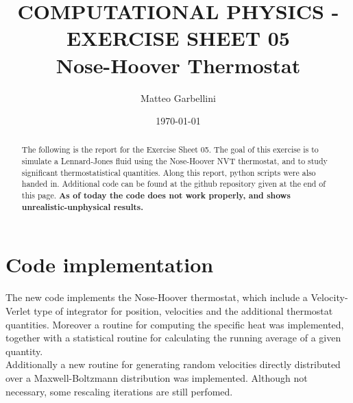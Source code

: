 \documentclass[aps,pra,reprint, onecolumn, rmp]{revtex4-2}
\begin{document}
\title{COMPUTATIONAL PHYSICS - EXERCISE SHEET 05 \\Nose-Hoover Thermostat}

\author{Matteo Garbellini}


\date{\today}

\begin{abstract}
The following is the report for the Exercise Sheet 05. The goal of this exercise is to simulate a Lennard-Jones fluid using the Nose-Hoover NVT thermostat, and to study significant thermostatistical quantities. Along this report, python scripts were also handed in. Additional code can be found at the github repository given at the end of this page. \textbf{As of today the code does not work properly, and shows unrealistic-unphysical results.}
\end{abstract}


\maketitle



\section{Code implementation}
The new code implements the Nose-Hoover thermostat, which include a Velocity-Verlet type of integrator for position, velocities and the additional thermostat quantities. Moreover a routine for computing the specific heat was implemented, together with a statistical routine for calculating the running average of a given quantity.\\

Additionally a new routine for generating random velocities directly distributed over a Maxwell-Boltzmann distribution was implemented. Although not necessary, some rescaling iterations are still perfomed. 

\end{document}
